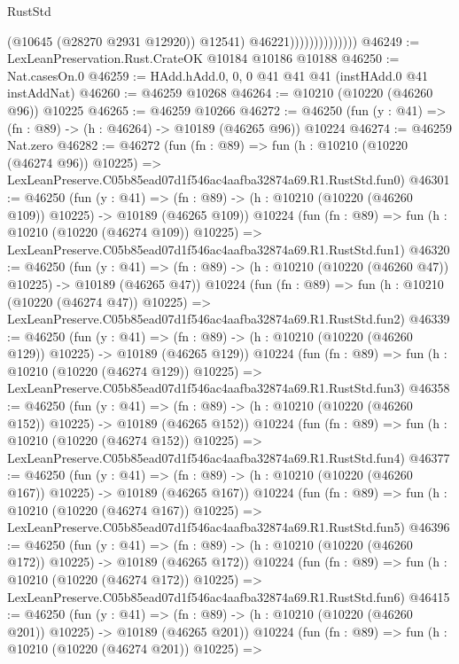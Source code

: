\begin{lexlean}{RustStd}
\begin{coremodule}
                                  (@10645 (@28270 @2931 @12920))
                                  @12541)
                                @46221))))))))))))))
@46249 := LexLeanPreservation.Rust.CrateOK @10184 @10186 @10188
@46250 := Nat.casesOn.{0}
@46259 := HAdd.hAdd.{0, 0, 0} @41 @41 @41 (instHAdd.{0} @41 instAddNat)
@46260 := @46259 @10268
@46264 := @10210 (@10220 (@46260 @96)) @10225
@46265 := @46259 @10266
@46272 := @46250 (fun (y : @41) => (fn : @89) -> (h : @46264) -> @10189 (@46265 @96)) @10224
@46274 := @46259 Nat.zero
@46282 := @46272
    (fun (fn : @89) =>
    fun (h : @10210 (@10220 (@46274 @96)) @10225) =>
    LexLeanPreserve.C05b85ead07d1f546ac4aafba32874a69.R1.RustStd.fun0)
@46301 := @46250
    (fun (y : @41) =>
    (fn : @89) -> (h : @10210 (@10220 (@46260 @109)) @10225) -> @10189 (@46265 @109))
    @10224
    (fun (fn : @89) =>
    fun (h : @10210 (@10220 (@46274 @109)) @10225) =>
    LexLeanPreserve.C05b85ead07d1f546ac4aafba32874a69.R1.RustStd.fun1)
@46320 := @46250
    (fun (y : @41) =>
    (fn : @89) -> (h : @10210 (@10220 (@46260 @47)) @10225) -> @10189 (@46265 @47))
    @10224
    (fun (fn : @89) =>
    fun (h : @10210 (@10220 (@46274 @47)) @10225) =>
    LexLeanPreserve.C05b85ead07d1f546ac4aafba32874a69.R1.RustStd.fun2)
@46339 := @46250
    (fun (y : @41) =>
    (fn : @89) -> (h : @10210 (@10220 (@46260 @129)) @10225) -> @10189 (@46265 @129))
    @10224
    (fun (fn : @89) =>
    fun (h : @10210 (@10220 (@46274 @129)) @10225) =>
    LexLeanPreserve.C05b85ead07d1f546ac4aafba32874a69.R1.RustStd.fun3)
@46358 := @46250
    (fun (y : @41) =>
    (fn : @89) -> (h : @10210 (@10220 (@46260 @152)) @10225) -> @10189 (@46265 @152))
    @10224
    (fun (fn : @89) =>
    fun (h : @10210 (@10220 (@46274 @152)) @10225) =>
    LexLeanPreserve.C05b85ead07d1f546ac4aafba32874a69.R1.RustStd.fun4)
@46377 := @46250
    (fun (y : @41) =>
    (fn : @89) -> (h : @10210 (@10220 (@46260 @167)) @10225) -> @10189 (@46265 @167))
    @10224
    (fun (fn : @89) =>
    fun (h : @10210 (@10220 (@46274 @167)) @10225) =>
    LexLeanPreserve.C05b85ead07d1f546ac4aafba32874a69.R1.RustStd.fun5)
@46396 := @46250
    (fun (y : @41) =>
    (fn : @89) -> (h : @10210 (@10220 (@46260 @172)) @10225) -> @10189 (@46265 @172))
    @10224
    (fun (fn : @89) =>
    fun (h : @10210 (@10220 (@46274 @172)) @10225) =>
    LexLeanPreserve.C05b85ead07d1f546ac4aafba32874a69.R1.RustStd.fun6)
@46415 := @46250
    (fun (y : @41) =>
    (fn : @89) -> (h : @10210 (@10220 (@46260 @201)) @10225) -> @10189 (@46265 @201))
    @10224
    (fun (fn : @89) =>
    fun (h : @10210 (@10220 (@46274 @201)) @10225) =>

\end{coremodule}
\end{lexlean}
